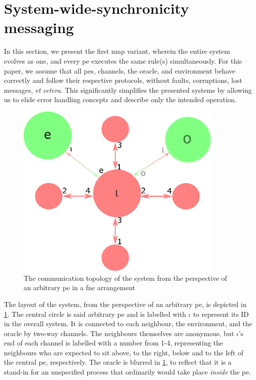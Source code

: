 \section{\label{sec:nmp:systemwide}System-wide-synchronicity messaging}

\cpresetrulenumber

In this section, we present the first \gls{nmp} variant, wherein the entire system evolves as one, and every \gls{pe} executes the same rule(s) simultaneously.  For this paper, we assume that all \glspl{pe}, channels, the oracle, and environment behave correctly and follow their respective protocols, without faults, corruptions, lost messages, \textit{et cetera}.  This significantly simplifies the presented systems by allowing us to elide error handling concepts and describe only the intended operation.

\begin{figure}
    \centering
    \includegraphics[width=0.9\textwidth]{chapters/nmp/images/iota_proxels_environment_oracle_v4.pdf}
    \caption[The communication topology of an \acrlong{nmp} system from the perspective of an arbitrary \acrshort{pe} in a \gls{fne} arrangement]{The communication topology of the system from the perspective of an arbitrary \gls{pe} in a \gls{fne} arrangement}
    \label{fig:nmp:iota_proxels_environment_oracle}
\end{figure}

The layout of the system, from the perspective of an arbitrary \gls{pe}, is depicted in \cref{fig:nmp:iota_proxels_environment_oracle}.  The central circle is said arbitrary \gls{pe} and is labelled with \(\iota\) to represent its ID in the overall system.  It is connected to each neighbour, the environment, and the oracle by two-way channels.  The neighbours themselves are anonymous, but \(\iota\)'s end of each channel is labelled with a number from 1-4, representing the neighbours who are expected to sit above, to the right, below and to the left of the central \gls{pe}, respectively.  The oracle is blurred in \cref{fig:nmp:iota_proxels_environment_oracle}, to reflect that it is a stand-in for an unspecified process that ordinarily would take place \emph{inside} the \gls{pe}.

